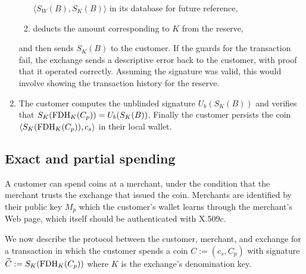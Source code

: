 \documentclass[sigconf, authordraft]{acmart}
\begin{document}
\begin{enumerate}
\begin{enumerate}
            $\langle S_W(B), S_K(B) \rangle$ in its database
            for future reference,
      \item deducts the amount corresponding to $K$ from the reserve,
    \end{enumerate}
    and then sends $S_K(B)$ to the customer.
    If the guards for the transaction fail, the exchange sends a descriptive
    error back to the customer, with proof that it operated correctly.
    Assuming the signature was valid, this would involve showing the transaction
    history for the reserve.
  \item The customer computes the unblinded signature $U_b(S_K(B))$ and
    verifies that $S_K(\textrm{FDH}_K(C_p)) = U_b(S_K(B))$.
    Finally the customer persists the coin $\langle S_K(\textrm{FDH}_K(C_p)), c_s \rangle$
    in their local wallet.
\end{enumerate}


\subsection{Exact and partial spending}

A customer can spend coins at a merchant, under the condition that the
merchant trusts the exchange that issued the coin.
Merchants are identified by their public key $M_p$ which the
customer's wallet learns through the merchant's Web page, which itself
should be authenticated with X.509c.

We now describe the protocol between the customer, merchant, and exchange
for a transaction in which the customer spends a coin $C := (c_s, C_p)$
with signature $\widetilde{C} := S_K(\textrm{FDH}_K(C_p))$
 where $K$ is the exchange's denomination key.

\end{document}
